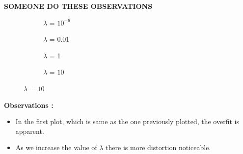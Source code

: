 \documentclass{article}
\begin{document}
\textbf{SOMEONE DO THESE OBSERVATIONS}

\begin{figure}[H]

\begin{subfigure}{.5\textwidth}
\centering
\caption{$\lambda$ = $10^{-6}$}
\end{subfigure}
\begin{subfigure}{.5\textwidth}
\caption{$\lambda$ = 0.01}
\end{subfigure}


\begin{subfigure}{.5\textwidth}
\centering
\caption{$\lambda$ = 1}
\end{subfigure}
\begin{subfigure}{.5\textwidth}
\caption{$\lambda$ = $10$}
\end{subfigure}



\end{figure}


\textbf{Observations :}

\begin{itemize}
\item In the first plot, which is same as the one previously plotted, the overfit is apparent.
\item As we increase the value of $\lambda$ there is more distortion noticeable.
\end{itemize}
\end{document}
